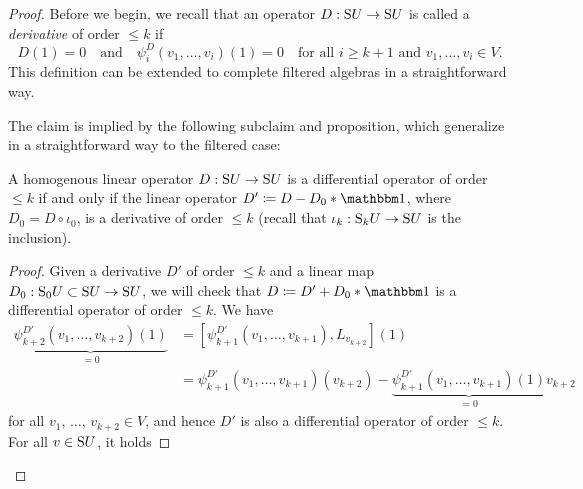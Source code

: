 \documentclass[\MainFolder/Text.tex]{subfiles}
\begin{document}
\begin{proof}
Before we begin, we recall that an operator $D: \mathrm{S} U \rightarrow \mathrm{S} U$ is called a \emph{derivative} of order $\le k$ if 
$$ D(1)=0\quad\text{and}\quad\psi_i^D(v_1,\dotsc,v_i)(1)=0\quad\text{for all }i\ge k+1\text{ and }v_1, \dotsc, v_i\in V. $$
This definition can be extended to complete filtered algebras in a straightforward way.
\begin{ProofList}
%
\item The claim is implied by the following subclaim and proposition, which generalize in a straightforward way to the filtered case:
\begin{SubClaim}\label{SubClaimFiltr}
A homogenous linear operator $D: \mathrm{S} U \rightarrow \mathrm{S} U$ is a differential operator of order $\le k$ if and only if the linear operator $D' \coloneqq D - D_0\Star \Id$, where $D_0 = D\circ\iota_0$, is a derivative of order $\le k$ (recall that $\iota_k: \mathrm{S}_k U \rightarrow \mathrm{S} U$ is the inclusion).
\end{SubClaim}
\begin{proof}
Given a derivative $D'$ of order $\le k$ and a linear map $D_0: \mathrm{S}_0 U\subset \mathrm{S} U \rightarrow \mathrm{S} U$, we will check that $D\coloneqq D' + D_0\Star \Id$ is a differential operator of order $\le k$. We have
\begin{align*}
 \underbrace{\psi_{k+2}^{D'}(v_1,\dotsc,v_{k+2})(1)}_{=0}&=
 [\psi^{D'}_{k+1}(v_1,\dotsc,v_{k+1}),L_{v_{k+2}}](1)\\
 &=\psi_{k+1}^{D'}(v_1,\dotsc,v_{k+1})(v_{k+2})-\underbrace{\psi_{k+1}^{D'}(v_1,\dotsc,v_{k+1})(1)}_{=0} v_{k+2}
\end{align*}
for all $v_1$, $\dotsc$, $v_{k+2}\in V$, and hence $D'$ is also a differential operator of order $\le k$. For all $v\in \mathrm{S} U$, it holds

\end{proof}
\end{ProofList}
\end{proof}
\end{document}
